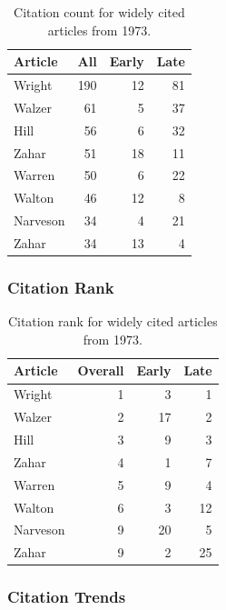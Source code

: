\documentclass[
  10pt,
  letterpaper,
  DIV=11,
  numbers=noendperiod,
  twoside]{scrartcl}
\begin{document}
\begin{longtable}[]{@{}lrrr@{}}

\caption{\label{tbl-citation-count-1973}Citation count for widely cited
articles from 1973.}

\tabularnewline

\toprule\noalign{}
Article & All & Early & Late \\
\midrule\noalign{}
\endhead
\bottomrule\noalign{}
\endlastfoot
Wright & 190 & 12 & 81 \\
Walzer & 61 & 5 & 37 \\
Hill & 56 & 6 & 32 \\
Zahar & 51 & 18 & 11 \\
Warren & 50 & 6 & 22 \\
Walton & 46 & 12 & 8 \\
Narveson & 34 & 4 & 21 \\
Zahar & 34 & 13 & 4 \\

\end{longtable}

\subsubsection*{Citation Rank}\label{sec-rank-1973}

\begin{longtable}[]{@{}lrrr@{}}

\caption{\label{tbl-citation-rank-1973}Citation rank for widely cited
articles from 1973.}

\tabularnewline

\toprule\noalign{}
Article & Overall & Early & Late \\
\midrule\noalign{}
\endhead
\bottomrule\noalign{}
\endlastfoot
Wright & 1 & 3 & 1 \\
Walzer & 2 & 17 & 2 \\
Hill & 3 & 9 & 3 \\
Zahar & 4 & 1 & 7 \\
Warren & 5 & 9 & 4 \\
Walton & 6 & 3 & 12 \\
Narveson & 9 & 20 & 5 \\
Zahar & 9 & 2 & 25 \\

\end{longtable}

\subsubsection*{Citation Trends}\label{sec-trends-1973}
\end{document}
